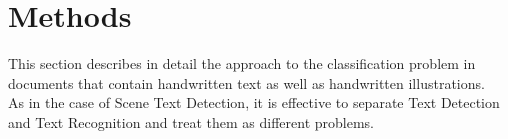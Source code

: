 \section{Methods}

This section describes in detail the approach to the classification problem
in documents that contain handwritten text as well as handwritten illustrations.\\

As in the case of Scene Text Detection, it is effective to separate Text Detection
and Text Recognition and treat them as different problems.
